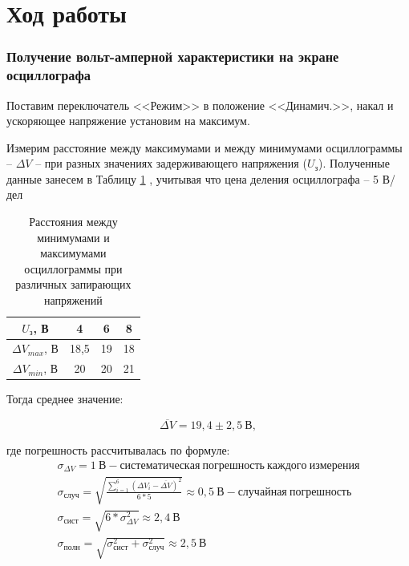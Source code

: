 \documentclass[a4paper,12pt]{article}
\begin{document}
\section*{Ход работы}

\subsubsection*{Получение вольт-амперной характеристики на экране осциллографа}

Поставим переключатель <<Режим>> в положение <<Динамич.>>, накал и ускоряющее напряжение установим на максимум.

Измерим расстояние между максимумами и между минимумами осциллограммы -- $\Delta V$ -- при разных значениях задерживающего напряжения ($U_з$). Полученные данные занесем в Таблицу \ref{table1} , учитывая что цена деления осциллографа -- 5 В/дел

\begin{table}[h!]
	\begin{center}
	\caption{Расстояния между минимумами и максимумами осциллограммы при различных запирающих напряжений}
	\label{table1}
	\begin{tabular}{|c|c|c|c|}
		\hline
		$U_з$, В & 4 & 6 & 8 \\ \hline
		$\Delta V_{max}$, В & 18,5 & 19 & {\color[HTML]{000000} 18} \\ \hline
		$\Delta V_{min}$, В & 20 & 20 & 21 \\ \hline
	\end{tabular}
	\end{center}
\end{table}

\newpage

Тогда среднее значение:

$$
	\overline {\Delta V} = 19,4 \pm 2,5 \ В,
$$

где погрешность рассчитывалась по формуле:
\begin{gather*}
	\sigma_{\Delta V} = 1 \ В - систематическая \ погрешность \ каждого \ измерения \\	
	\sigma_{случ} = \sqrt{\frac{\sum \limits_{i=1}^{6} (\Delta V_i - \overline {\Delta V})^2 }{6 * 5}} \approx 0,5 \ В - случайная \ погрешность \\
	\sigma_{сист} = \sqrt{6 * \sigma_{\Delta V}^2} \approx 2,4 \ В \\
	\sigma_{полн} = \sqrt{\sigma_{сист}^2 + \sigma_{случ}^2} \approx 2,5 \ В
\end{gather*}
\end{document}
